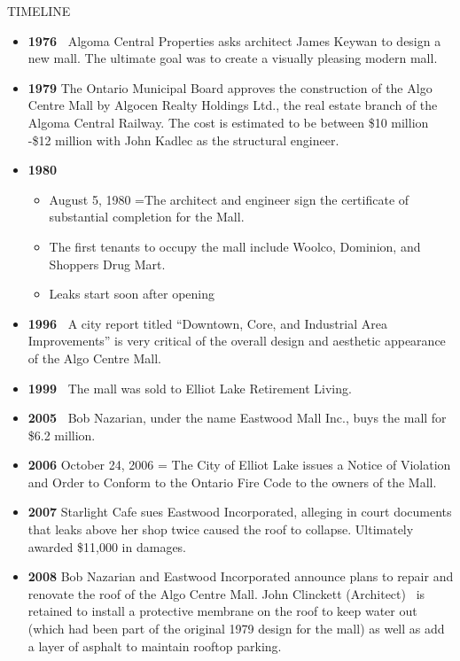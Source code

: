 \documentclass[12pt]{article}
\begin{document}
TIMELINE

\begin{itemize}
    \item \textbf{\textbf{1976 }}
Algoma Central Properties asks architect James Keywan to design a new mall. The ultimate goal was to create a visually pleasing modern mall. 

    \item \textbf{\textbf{1979}}
The Ontario Municipal Board approves the construction of the Algo Centre Mall by Algocen Realty Holdings Ltd., the real estate branch of the Algoma Central Railway. The cost is estimated to be between \$10 million -\$12 million with John Kadlec as the structural engineer.

    \item \textbf{\textbf{1980}}
    \begin{itemize}
        \item August 5, 1980 =The architect and engineer sign the certificate of substantial completion for the Mall.
        \item The first tenants to occupy the mall include Woolco, Dominion, and Shoppers Drug Mart.
        \item Leaks start soon after opening 
    \end{itemize}
    \item \textbf{\textbf{1996 }}
A city report titled “Downtown, Core, and Industrial Area Improvements” is very critical of the overall design and aesthetic appearance of the Algo Centre Mall.

    \item \textbf{\textbf{1999 }}
The mall was sold to Elliot Lake Retirement Living.

    \item \textbf{\textbf{2005 }}
Bob Nazarian, under the name Eastwood Mall Inc., buys the mall for \$6.2 million.

    \item \textbf{\textbf{2006}}
October 24, 2006 = The City of Elliot Lake issues a Notice of Violation and Order to Conform to the Ontario Fire Code to the owners of the Mall.

    \item \textbf{\textbf{2007}}
Starlight Cafe sues Eastwood Incorporated, alleging in court documents that leaks above her shop twice caused the roof to collapse. Ultimately awarded \$11,000 in damages.

    \item \textbf{\textbf{2008}}
Bob Nazarian and Eastwood Incorporated announce plans to repair and renovate the roof of the Algo Centre Mall. John Clinckett (Architect)  is retained to install a protective membrane on the roof to keep water out (which had been part of the original 1979 design for the mall) as well as add a layer of asphalt to maintain rooftop parking.


\end{itemize}
\end{document}
